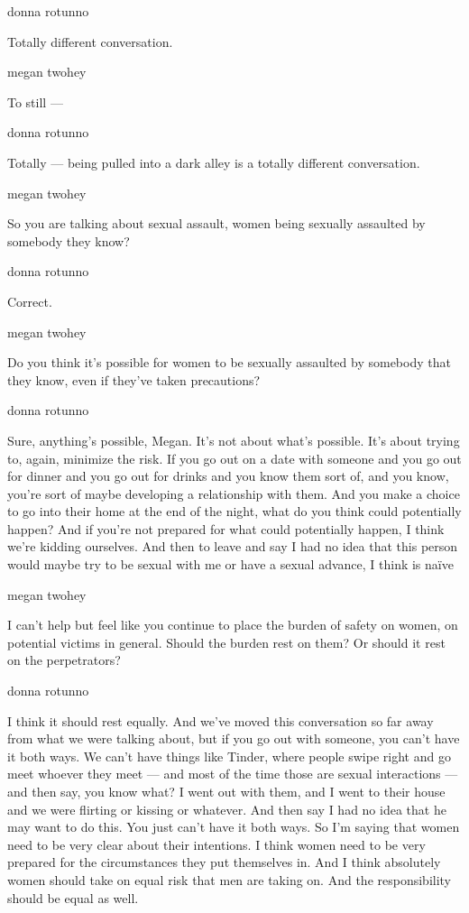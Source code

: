donna rotunno

Totally different conversation.

megan twohey

To still ---

donna rotunno

Totally --- being pulled into a dark alley is a totally different
conversation.

megan twohey

So you are talking about sexual assault, women being sexually assaulted
by somebody they know?

donna rotunno

Correct.

megan twohey

Do you think it's possible for women to be sexually assaulted by
somebody that they know, even if they've taken precautions?

donna rotunno

Sure, anything's possible, Megan. It's not about what's possible. It's
about trying to, again, minimize the risk. If you go out on a date with
someone and you go out for dinner and you go out for drinks and you know
them sort of, and you know, you're sort of maybe developing a
relationship with them. And you make a choice to go into their home at
the end of the night, what do you think could potentially happen? And if
you're not prepared for what could potentially happen, I think we're
kidding ourselves. And then to leave and say I had no idea that this
person would maybe try to be sexual with me or have a sexual advance, I
think is naïve

megan twohey

I can't help but feel like you continue to place the burden of safety on
women, on potential victims in general. Should the burden rest on them?
Or should it rest on the perpetrators?

donna rotunno

I think it should rest equally. And we've moved this conversation so far
away from what we were talking about, but if you go out with someone,
you can't have it both ways. We can't have things like Tinder, where
people swipe right and go meet whoever they meet --- and most of the
time those are sexual interactions --- and then say, you know what? I
went out with them, and I went to their house and we were flirting or
kissing or whatever. And then say I had no idea that he may want to do
this. You just can't have it both ways. So I'm saying that women need to
be very clear about their intentions. I think women need to be very
prepared for the circumstances they put themselves in. And I think
absolutely women should take on equal risk that men are taking on. And
the responsibility should be equal as well.

